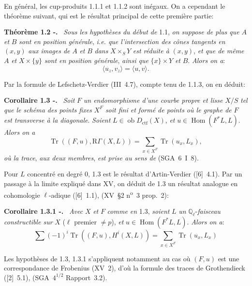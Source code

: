 \documentclass[11pt]{article}
\newenvironment{statement}[1]{\par\medskip\noindent\textbf{#1.}\ }{\par\medskip}
\DeclareMathOperator{\Hom}{Hom}
\newcommand{\R}{\mathrm{R}}\newcommand{\RHomCore}{\mathrm{RHom}}
\newcommand{\ob}{\operatorname{ob}}
\providecommand{\ctf}{\mathrm{ctf}}
\providecommand{\Tr}{\operatorname{Tr}}
\providecommand{\Tr}{\operatorname{Tr}}
\providecommand{\Tr}{\operatorname{Tr}}
\providecommand{\Hom}{\operatorname{Hom}}
\providecommand{\ob}{\operatorname{ob}}
\providecommand{\R}{\mathrm R}
\providecommand{\Tr}{\operatorname{Tr}}
\providecommand{\Hom}{\operatorname{Hom}}
\providecommand{\Tr}{\operatorname{Tr}}
\begin{document}
En général, les cup-produits 1.1.1 et 1.1.2 sont inégaux. On a cependant le théorème suivant, qui est le résultat principal de cette première partie:

\begin{statement}{Théorème 1.2 -}
\emph{Sous les hypothèses du début de} 1.1, \emph{on suppose de plus que} $A$ \emph{et} $B$ \emph{sont en position générale}, \emph{i.e. que l'intersection des cônes tangents en} $(x,y)$ \emph{aux images de} $A$ \emph{et} $B$ \emph{dans} $X\times_S Y$ \emph{est réduite à} $(x,y)$, \emph{et que de même} $A$ \emph{et} $X\times\{y\}$ \emph{sont en position générale}, \emph{ainsi que} $\{x\}\times Y$ \emph{et} $B$. \emph{Alors on a}:
\begin{equation}\tag{1.2.1}
\langle u_z,v_z\rangle=\langle u,v\rangle.
\end{equation}
\end{statement}

Par la
formule de Lefschetz-Verdier (III~4.7), compte tenu de 1.1.3, on en déduit:

\begin{statement}{Corollaire 1.3 -}
\emph{Soit} $F$ \emph{un endomorphisme d'une courbe propre et lisse} $X/S$ \emph{tel que le schéma des points fixes} $X^F$ \emph{soit fini et formé de points où le graphe de} $F$ \emph{est transverse à la diagonale}. \emph{Soient} $L\in\ob D_{\ctf}(X)$, \emph{et} $u\in\Hom(F^*L,L)$. \emph{Alors on a}
\[
\Tr((F,u),\R\Gamma(X,L))=\sum_{x\in X^F}\Tr(u_x,L_x),
\]
\emph{où la trace}, \emph{aux deux membres}, \emph{est prise au sens de} (SGA~6~I~8).
\end{statement}

Pour $L$ concentré en degré $0$, 1.3 est le résultat d'Artin-Verdier ([6]~4.1). Par un passage à la limite expliqué dans XV, on déduit de 1.3 un résultat analogue en cohomologie $\ell$-adique ([6]~1.1), (XV~\S2 n\textsuperscript{o}~3 prop.~2):

\begin{statement}{Corollaire 1.3.1 -}
\emph{Avec} $X$ \emph{et} $F$ \emph{comme en} 1.3, \emph{soient} $L$ \emph{un} $\mathbb Q_\ell$-\emph{faisceau constructible sur} $X$ ($\ell$ premier $\ne p$), \emph{et} $u\in\Hom(F^*L,L)$. \emph{Alors on a}:
\[
\sum(-1)^i\Tr((F,u),H^i(X,L))=\sum_{x\in X^F}\Tr(u_x,L_x)
\]
\end{statement}

Les hypothèses de 1.3, 1.3.1 s'appliquent notamment au cas où $(F,u)$ est une correspondance de Frobenius (XV~2), d'où la formule des traces de Grothendieck ([2]~5.1), (SGA~$4^{1/2}$ Rapport~3.2).
\end{document}
